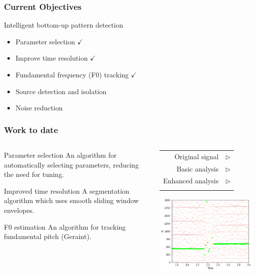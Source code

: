 \begin{frame}
\frametitle{Current Objectives}
	\begin{block}{Intelligent bottom-up pattern detection}
		\begin{itemize}
			\item Parameter selection $\checkmark$
			\item Improve time resolution $\checkmark$
			\item Fundamental frequency (F0) tracking $\checkmark$
			\item Source detection and isolation
			\item Noise reduction
		\end{itemize}
	\end{block}
\end{frame}

\begin{frame}
\frametitle{Work to date}
	\begin{columns}
		\begin{column}{0.5\textwidth}
			\begin{block}{Parameter selection \checkmark}	
				An algorithm for automatically selecting parameters, reducing the need for tuning.
			\end{block}
			\begin{block}{Improved time resolution \checkmark}
				A segmentation algorithm which uses smooth sliding window envelopes.
			\end{block}
			\begin{block}{F0 estimation \checkmark}
				An algorithm for tracking fundamental pitch (Geraint).
			\end{block}
		\end{column}
		\begin{column}{0.5\textwidth}
			\begin{tabular}{r l}
				Original signal & $\rhd$ \\
				Basic analysis & $\rhd$  \\ 
				Enhanced analysis & $\rhd$ \\
				& \\
			\end{tabular} 
			\includegraphics[width=\textwidth]{images/f0-flute.png}

\end{column}
\end{columns}
\end{frame}
